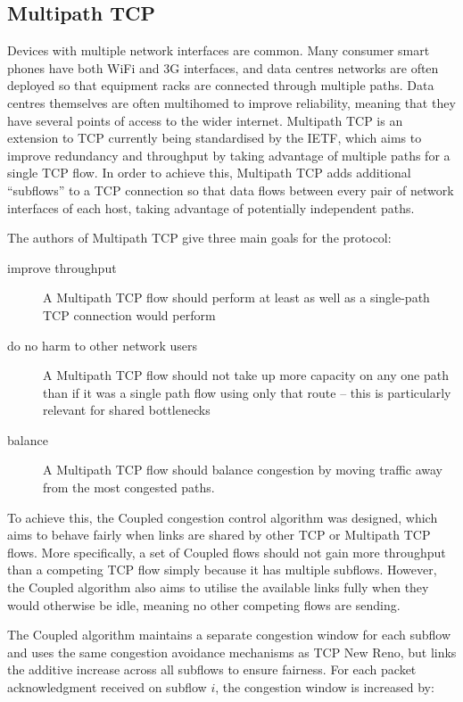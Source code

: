 \subsection{Multipath TCP}
\label{sec:bg:mptcp}
Devices with multiple network interfaces are common. Many consumer smart phones
have both WiFi and 3G interfaces, and data centres networks are often deployed
so that equipment racks are connected through multiple paths. Data centres
themselves are often multihomed to improve reliability, meaning that they have
several points of access to the wider internet. Multipath TCP is an extension to
TCP currently being standardised by the IETF, which aims to improve redundancy
and throughput by taking advantage of multiple paths for a single TCP flow. In
order to achieve this, Multipath TCP adds additional ``subflows'' to a TCP
connection so that data flows between every pair of network interfaces of each
host, taking advantage of potentially independent paths.

The authors of Multipath TCP give three main goals for the protocol:

\begin{description}
  \item[improve throughput] A Multipath TCP flow should perform at least as well
    as a single-path TCP connection would perform
  \item[do no harm to other network users] A Multipath TCP flow should not take
    up more capacity on any one path than if it was a single path flow using
    only that route -- this is particularly relevant for shared bottlenecks
  \item[balance] A Multipath TCP flow should balance congestion by moving
    traffic away from the most congested paths.
\end{description}

To achieve this, the Coupled congestion control algorithm was designed, which
aims to behave fairly when links are shared by other TCP or Multipath TCP flows.
More specifically, a set of Coupled flows should not gain more throughput than a
competing TCP flow simply because it has multiple subflows. However, the Coupled
algorithm also aims to utilise the available links fully when they would
otherwise be idle, meaning no other competing flows are sending.

The Coupled algorithm maintains a separate congestion window for each subflow
and uses the same congestion avoidance mechanisms as TCP New Reno, but links the
additive increase across all subflows to ensure fairness. For each packet
acknowledgment received on subflow $i$, the congestion window is increased by:

